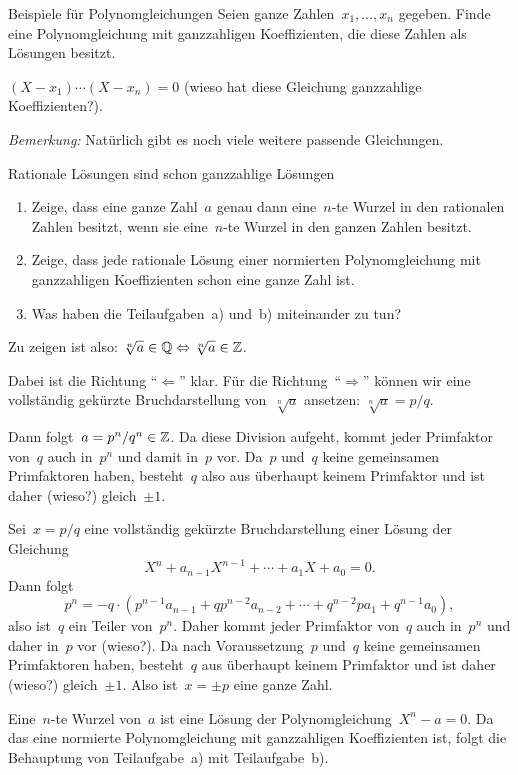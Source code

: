 \documentclass{algblatt}
\begin{document}
\ifloesungen\newpage\fi
\begin{aufgabe}{Beispiele für Polynomgleichungen}
Seien ganze Zahlen~$x_1, \ldots, x_n$ gegeben. Finde eine Polynomgleichung mit
ganzzahligen Koeffizienten, die diese Zahlen als Lösungen besitzt.
\begin{loesung}$(X-x_1) \cdots (X-x_n) = 0$ (wieso hat diese Gleichung
ganzzahlige Koeffizienten?).

\emph{Bemerkung:} Natürlich gibt es noch viele weitere passende Gleichungen.
\end{loesung}
\end{aufgabe}

\begin{aufgabe}{Rationale Lösungen sind schon ganzzahlige Lösungen}
\begin{enumerate}
  \item Zeige, dass eine ganze Zahl~$a$ genau dann eine~$n$-te Wurzel in den
  rationalen Zahlen besitzt, wenn sie eine~$n$-te Wurzel in den ganzen Zahlen
  besitzt.
  \item Zeige, dass jede rationale Lösung einer normierten Polynomgleichung mit
  ganzzahligen Koeffizienten schon eine ganze Zahl ist.
  \item Was haben die Teilaufgaben~a) und~b) miteinander zu tun?
\end{enumerate}
\begin{loesungE}
\item Zu zeigen ist also: $\sqrt[n]{a} \in \mathbb{Q} \Leftrightarrow \sqrt[n]{a} \in
\mathbb{Z}$.

Dabei ist die Richtung "`$\Leftarrow$"' klar. Für die
Richtung~"`$\Rightarrow$"' können wir eine vollständig gekürzte
Bruchdarstellung von~$\sqrt[n]{a}$ ansetzen: $\sqrt[n]{a} = p/q$.

Dann folgt~$a = p^n / q^n \in \mathbb{Z}$. Da diese Division aufgeht, kommt jeder
Primfaktor von~$q$ auch in~$p^n$ und damit in~$p$ vor. Da~$p$ und~$q$ keine
gemeinsamen Primfaktoren haben, besteht~$q$ also aus überhaupt keinem
Primfaktor und ist daher (wieso?) gleich~$\pm 1$.
\item Sei~$x = p/q$ eine vollständig gekürzte Bruchdarstellung einer Lösung der
Gleichung
\[ X^n + a_{n-1} X^{n-1} + \cdots + a_1 X + a_0 = 0. \]
Dann folgt
\[ p^n = -q \cdot (p^{n-1} a_{n-1} + q p^{n-2} a_{n-2} + \cdots + q^{n-2} p
a_1 + q^{n-1} a_0), \]
also ist~$q$ ein Teiler von~$p^n$. Daher kommt jeder Primfaktor von~$q$ auch
in~$p^n$ und daher in~$p$ vor (wieso?). Da nach Voraussetzung~$p$ und~$q$ keine
gemeinsamen Primfaktoren haben, besteht~$q$ aus überhaupt keinem Primfaktor und
ist daher (wieso?) gleich~$\pm1$. Also ist~$x = \pm p$ eine ganze Zahl.
\item Eine~$n$-te Wurzel von~$a$ ist eine Lösung der Polynomgleichung~$X^n - a
= 0$. Da das eine normierte Polynomgleichung mit ganzzahligen Koeffizienten
ist, folgt die Behauptung von Teilaufgabe~a) mit Teilaufgabe~b).
\end{loesungE}
\end{aufgabe}
\end{document}
